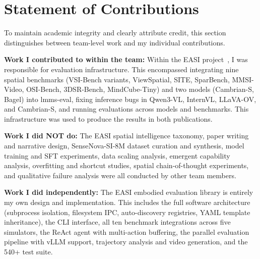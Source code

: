 \documentclass[
hf,
]{confart}
\begin{document}
\section{Statement of Contributions}
\label{sec:appendix_contributions}

To maintain academic integrity and clearly attribute credit, this section distinguishes between team-level work and my individual contributions.

\textbf{Work I contributed to within the team:} Within the EASI project~\cite{cai2025holisticevaluationmultimodalllms, cai2025scalingspatialintelligencemultimodal}, I was responsible for evaluation infrastructure. This encompassed integrating nine spatial benchmarks (VSI-Bench variants, ViewSpatial, SITE, SparBench, MMSI-Video, OSI-Bench, 3DSR-Bench, MindCube-Tiny) and two models (Cambrian-S, Bagel) into lmms-eval, fixing inference bugs in Qwen3-VL, InternVL, LLaVA-OV, and Cambrian-S, and running evaluations across models and benchmarks. This infrastructure was used to produce the results in both publications.

\textbf{Work I did NOT do:} The EASI spatial intelligence taxonomy, paper writing and narrative design, SenseNova-SI-8M dataset curation and synthesis, model training and SFT experiments, data scaling analysis, emergent capability analysis, overfitting and shortcut studies, spatial chain-of-thought experiments, and qualitative failure analysis were all conducted by other team members.

\textbf{Work I did independently:} The EASI embodied evaluation library is entirely my own design and implementation. This includes the full software architecture (subprocess isolation, filesystem IPC, auto-discovery registries, YAML template inheritance), the CLI interface, all ten benchmark integrations across five simulators, the ReAct agent with multi-action buffering, the parallel evaluation pipeline with vLLM support, trajectory analysis and video generation, and the 540+ test suite.
\end{document}
